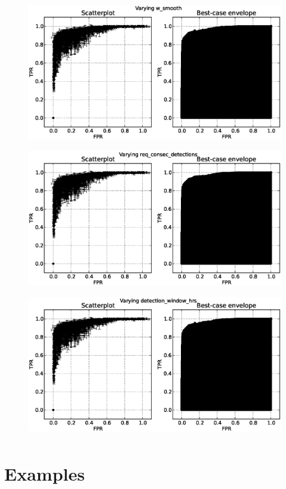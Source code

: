 \begin{figure}[!h]
\begin{center}
\includegraphics[height=2.5in]{../fig/final/scatter_env/w_smooth}
\includegraphics[height=2.5in]{../fig/final/scatter_env/req_consec_detections}
\includegraphics[height=2.5in]{../fig/final/scatter_env/detection_window_hrs}
\end{center}
\caption{\label{fig:roc_env1}}
\end{figure}


\section{Examples} %

